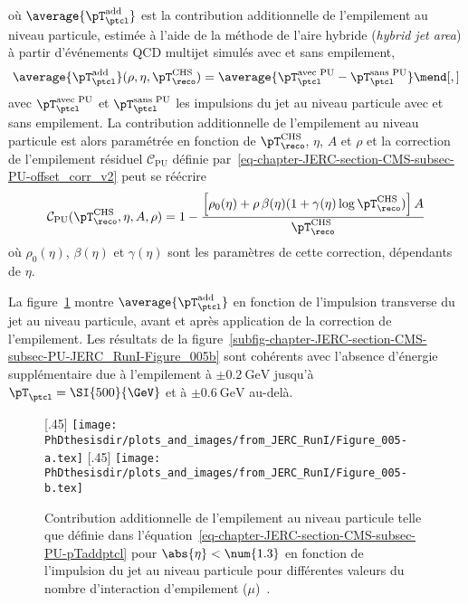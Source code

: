 où $\average{\pT_\ptcl^\text{add}}$ est la contribution additionnelle de l'empilement au niveau particule, estimée à l'aide de la méthode de l'aire hybride (\emph{hybrid jet area}) à partir d'événements QCD multijet simulés avec et sans empilement, \ie
\begin{equation}
\average{\pT_\ptcl^\text{add}}(\rho, \eta, \pT_\reco^\text{CHS})
=
\average{\pT_\ptcl^\text{avec PU} - \pT_\ptcl^\text{sans PU}}
\mend[,]
\label{eq-chapter-JERC-section-CMS-subsec-PU-pTaddptcl}
\end{equation}
avec
$\pT_\ptcl^\text{avec PU}$ et $\pT_\ptcl^\text{sans PU}$
les impulsions du jet au niveau particule avec et sans empilement.
La contribution additionnelle de l'empilement au niveau particule est alors paramétrée en fonction de $\pT_\reco^\text{CHS}$, $\eta$, $A$ et $\rho$ et la correction de l'empilement résiduel $\mathcal{C}_\text{PU}$ définie par~\eqref{eq-chapter-JERC-section-CMS-subsec-PU-offset_corr_v2} peut se réécrire
\begin{equation}
\mathcal{C}_\text{PU}(\pT_\reco^\text{CHS}, \eta, A, \rho)
= 1 - \frac{\left[\rho_0(\eta) + \rho\,\beta(\eta)(1+\gamma(\eta)\log\pT_\reco^\text{CHS})\right]A}{\pT_\reco^\text{CHS}}
\label{eq-chapter-JERC-section-CMS-subsec-PU-offset_corr_v1}
\end{equation}
où $\rho_0(\eta)$, $\beta(\eta)$ et $\gamma(\eta)$ sont les paramètres de cette correction, dépendants de $\eta$.
\par La figure~\ref{fig-chapter-JERC-section-CMS-subsec-PU-JERC_RunI-Figure_005} montre $\average{\pT_\ptcl^\text{add}}$ en fonction de l'impulsion transverse du jet au niveau particule, avant et après application de la correction de l'empilement.
Les résultats de la figure~\ref{subfig-chapter-JERC-section-CMS-subsec-PU-JERC_RunI-Figure_005b} sont cohérents avec l'absence d'énergie supplémentaire due à l'empilement à $\pm\SI{0.2}{\GeV}$ jusqu'à $\pT_\ptcl = \SI{500}{\GeV}$ et à $\pm\SI{0.6}{\GeV}$ au-delà.
\begin{figure}[h]
\centering
{}[.45\textwidth]
{\texttt{[image: \\PhDthesisdir/plots\_and\_images/from\_JERC\_RunI/Figure\_005-a.tex]}}
\hfill
{}[.45\textwidth]
{\texttt{[image: \\PhDthesisdir/plots\_and\_images/from\_JERC\_RunI/Figure\_005-b.tex]}}
\caption[Contribution additionnelle de l'empilement au niveau particule.]{Contribution additionnelle de l'empilement au niveau particule telle que définie dans l'équation~\eqref{eq-chapter-JERC-section-CMS-subsec-PU-pTaddptcl} pour $\abs{\eta}<\num{1.3}$ en fonction de l'impulsion du jet au niveau particule pour différentes valeurs du nombre d'interaction d'empilement ($\mu$)~\cite{JERC_RunI}.}
\label{fig-chapter-JERC-section-CMS-subsec-PU-JERC_RunI-Figure_005}
\end{figure}
